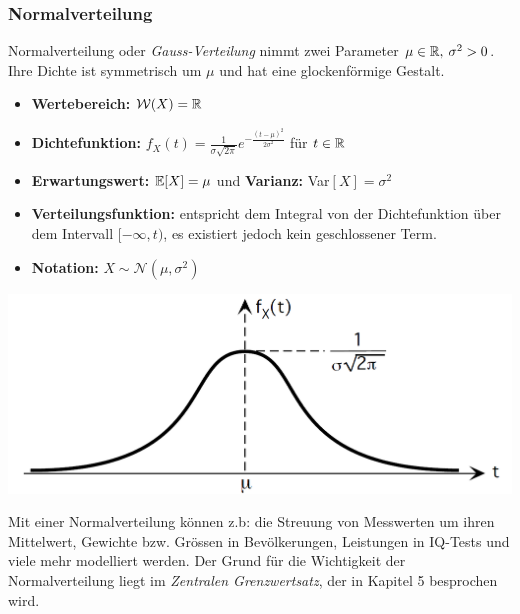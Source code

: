 \subsubsection{Normalverteilung}
Normalverteilung oder \textit{Gauss-Verteilung} nimmt zwei Parameter $\mu \in \mathbb{R},\: \sigma^2 > 0$. Ihre Dichte ist symmetrisch um $\mu$ und hat eine glockenförmige Gestalt.
\begin{itemize}
\item \textbf{Wertebereich:} $\mathcal{W}(X) = \mathbb{R}$
\item \textbf{Dichtefunktion:} $f_X(t) = \frac{1}{\sigma \sqrt{2\pi}}e^{- \frac{(t-\mu)^2}{2\sigma^2}}$ für $t\in \mathbb{R}$
\item \textbf{Erwartungswert:} $\mathbb{E}[X] = \mu$ und \textbf{Varianz:} Var$[X] = \sigma^2$
\item \textbf{Verteilungsfunktion:} entspricht dem Integral von der Dichtefunktion über dem Intervall $[-\infty, t)$, es existiert jedoch kein geschlossener Term.
\item \textbf{Notation:} $X \sim \mathcal{N}(\mu, \sigma^2)$
\end{itemize}
\begin{center}
\includegraphics[scale=0.3]{normalverteilung.png}
\end{center}
Mit einer Normalverteilung können z.b: die Streuung von Messwerten um ihren Mittelwert, Gewichte bzw. Grössen in Bevölkerungen, Leistungen in IQ-Tests und viele mehr modelliert werden. Der Grund für die Wichtigkeit der Normalverteilung liegt im \textit{Zentralen Grenzwertsatz}, der in Kapitel 5 besprochen wird.

